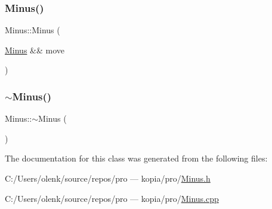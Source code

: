 \mbox{\label{class_minus_a2fb3ccb1913a42c49a2a59216975c264}} 
\subsubsection{\texorpdfstring{Minus()}{Minus()}\hspace{0.1cm}{\footnotesize\ttfamily [2/2]}}
{\footnotesize\ttfamily Minus\+::\+Minus (\begin{DoxyParamCaption}\item[{\mbox{\hyperlink{class_minus}{Minus}} \&\&}]{move }\end{DoxyParamCaption})}

\mbox{\label{class_minus_aaedbd18eff14944142f4800c07492020}} 
\subsubsection{\texorpdfstring{$\sim$Minus()}{~Minus()}}
{\footnotesize\ttfamily Minus\+::$\sim$\+Minus (\begin{DoxyParamCaption}{ }\end{DoxyParamCaption})}



The documentation for this class was generated from the following files\+:\begin{DoxyCompactItemize}
\item 
C\+:/\+Users/olenk/source/repos/pro — kopia/pro/\mbox{\hyperlink{_minus_8h}{Minus.\+h}}\item 
C\+:/\+Users/olenk/source/repos/pro — kopia/pro/\mbox{\hyperlink{_minus_8cpp}{Minus.\+cpp}}\end{DoxyCompactItemize}
